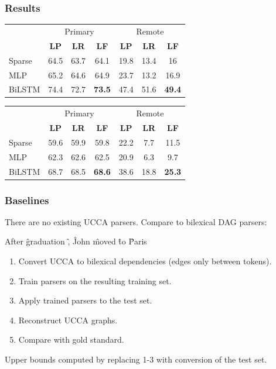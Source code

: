 \documentclass[t]{beamer}
\begin{document}
\begin{frame}
\frametitle{Results}
\begin{center}
	\begin{tabular}{l|ccc|ccc}
	& \multicolumn{3}{c|}{Primary} & \multicolumn{3}{c}{Remote} \\
	& \textbf{LP} & \textbf{LR} & \textbf{LF} & \textbf{LP} & \textbf{LR} & \textbf{LF} \\
	\hline
	Sparse
	& 64.5 & 63.7 & 64.1 & 19.8 & 13.4 & 16 \\
	MLP
	& 65.2 & 64.6 & 64.9 & 23.7 & 13.2 & 16.9 \\
	BiLSTM
	& 74.4 & 72.7 & \textbf{73.5} & 47.4 & 51.6 & \textbf{49.4}
	\end{tabular}
	
	\vfill
	\pause
	\begin{tabular}{l|ccc|ccc}
	& \multicolumn{3}{c|}{Primary} & \multicolumn{3}{c}{Remote} \\
	& \textbf{LP} & \textbf{LR} & \textbf{LF} & \textbf{LP} & \textbf{LR} & \textbf{LF} \\
	\hline
	Sparse
	& 59.6 & 59.9 & 59.8 & 22.2 & 7.7 & 11.5 \\
	MLP
	& 62.3 & 62.6 & 62.5 & 20.9 & 6.3 & 9.7 \\
	BiLSTM
	& 68.7 & 68.5 & \textbf{68.6} & 38.6 & 18.8 & \textbf{25.3}
	\end{tabular}
\end{center}
\end{frame}

\begin{frame}
\frametitle{Baselines}
There are no existing UCCA parsers. Compare to bilexical DAG parsers:
\begin{center}
	\begin{dependency}[theme = simple]
	\begin{deptext}[column sep=.7em,ampersand replacement=\^]
	After \^ graduation \^ , \^ John \^ moved \^ to \^ Paris \\
	\end{deptext}
	\end{dependency}
\end{center}

\vfill
\pause
\begin{enumerate}
 \item Convert UCCA to bilexical dependencies (edges only between tokens).
 \item Train parsers on the resulting training set.
 \item Apply trained parsers to the test set.
 \item Reconstruct UCCA graphs.
 \item Compare with gold standard.
\end{enumerate}

Upper bounds computed by replacing 1-3 with conversion of the test set.
\end{frame}
\end{document}
